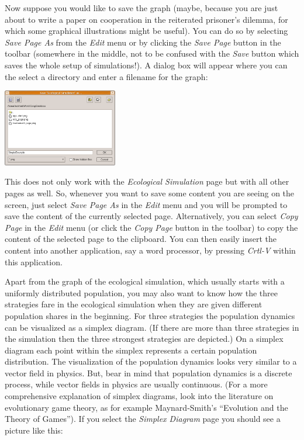 \documentclass[12pt,a4paper,USenglish]{article}
\begin{document}
Now suppose you would like to save the graph (maybe, because you are
just about to write a paper on cooperation in the reiterated prisoner's
dilemma, for which some graphical illustrations might be useful).
You can do so by selecting \emph{Save Page As} from the \emph{Edit}
menu or by clicking the \emph{Save Page} button in the toolbar (somewhere
in the middle, not to be confused with the \emph{Save} button which
saves the whole setup of simulations!). A dialog box will appear where
you can the select a directory and enter a filename for the graph:

\begin{center}
\includegraphics[width=5cm,keepaspectratio]{big_images/save_page_dialog.png}
\end{center}

This does not only work with the \emph{Ecological Simulation} page
but with all other pages as well. So, whenever you want to save some
content you are seeing on the screen, just select \emph{Save Page As}
in the \emph{Edit} menu and you will be prompted to save the content
of the currently selected page. Alternatively, you can select \emph{Copy
Page} in the \emph{Edit} menu (or click the \emph{Copy Page} button
in the toolbar) to copy the content of the selected page to the clipboard.
You can then easily insert the content into another application, say
a word processor, by pressing \emph{Crtl-V} within this application.

Apart from the graph of the ecological simulation, which usually starts with a
uniformly distributed population, you may also want to know how the three
strategies fare in the ecological simulation when they are given different
population shares in the beginning.  For three strategies the population
dynamics can be visualized as a simplex diagram. (If there are more than three
strategies in the simulation then the three strongest strategies are depicted.)
On a simplex diagram each point within the simplex represents a certain
population distribution. The visualization of the population dynamics looks
very similar to a vector field in physics. But, bear in mind that population
dynamics is a discrete process, while vector fields in physics are usually
continuous. (For a more comprehensive explanation of simplex diagrams, look
into the literature on evolutionary game theory, as for example
Maynard-Smith's ``Evolution and the Theory of Games''). If you select the
\emph{Simplex Diagram} page you should see a picture like this:
\end{document}
